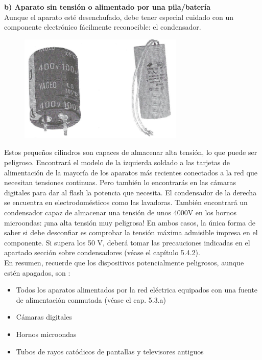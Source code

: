 \documentclass[a5paper,twoside,openany]{book}
\begin{document}
\textbf{b) Aparato sin tensión o alimentado por una pila/batería}\\
Aunque el aparato esté desenchufado, debe tener especial cuidado con
un componente electrónico fácilmente reconocible: el condensador.
\begin{figure}[h]
\includegraphics[width=0.7\textwidth]{condensadores} 
\centering
\end{figure}

Estos pequeños cilindros son capaces de almacenar alta tensión, lo que puede ser
peligroso.
Encontrará el modelo de la izquierda soldado a las tarjetas de alimentación de la mayoría de los aparatos más recientes conectados a la red que necesitan tensiones continuas. Pero también lo encontrarás en las cámaras digitales para dar al flash la potencia que necesita. El condensador de la derecha se encuentra en electrodomésticos como las lavadoras. También encontrará un condensador capaz de almacenar una tensión de unos 4000V en los hornos microondas: ¡una alta tensión muy peligrosa!
En ambos casos, la única forma de saber si debe desconfiar es
comprobar la tensión máxima admisible impresa en el componente.
Si supera los 50 V, deberá tomar las precauciones indicadas en el apartado
sección sobre condensadores (véase el capítulo 5.4.2).\\

En resumen, recuerde que los dispositivos potencialmente peligrosos, aunque estén apagados, son :
\begin{itemize}
\item Todos los aparatos alimentados por la red eléctrica equipados con una fuente de alimentación conmutada (véase el cap. 5.3.a)
\item Cámaras digitales
\item Hornos microondas
\item Tubos de rayos catódicos de pantallas y televisores antiguos
\end{itemize}
\end{document}
